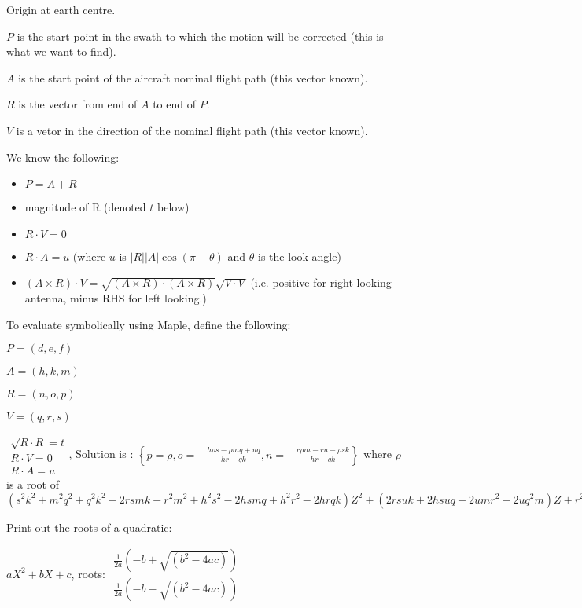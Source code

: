 \documentclass[12pt]{article}
\begin{document}
Origin at earth centre.

$P$ is the start point in the swath to which the motion will be corrected
(this is what we want to find).

$A$ is the start point of the aircraft nominal flight path (this vector
known).

$R$ is the vector from end of $A$ to end of $P$.

$V$ is a vetor in the direction of the nominal flight path (this vector
known).

We know the following:

\begin{itemize}
\item  $P=A+R$

\item  magnitude of R (denoted $t$ below)

\item  $R\cdot V=0$

\item  $R\cdot A=u$ (where $u$ is $\left| R\right| \left| A\right| \cos
\left( \pi -\theta \right) $ and $\theta $ is the look angle)

\item  $(A\times R)\cdot V=\sqrt{(A\times R)\cdot (A\times R)}\sqrt{V\cdot V}
$ (i.e. positive for right-looking antenna, minus RHS for left looking.)
\end{itemize}

To evaluate symbolically using Maple, define the following:

$P=(d,e,f)$

$A=(h,k,m)$

$R=(n,o,p)$

$V=(q,r,s)$

$
\begin{array}{l}
\sqrt{R\cdot R}=t \\ 
R\cdot V=0 \\ 
R\cdot A=u
\end{array}
$, Solution is : $\left\{ p=\rho ,o=-\frac{h\rho s-\rho mq+uq}{hr-qk},n=-%
\frac{r\rho m-ru-\rho sk}{hr-qk}\right\} $ where $\rho $ is a root of $%
\left(
s^{2}k^{2}+m^{2}q^{2}+q^{2}k^{2}-2rsmk+r^{2}m^{2}+h^{2}s^{2}-2hsmq+h^{2}r^{2}-2hrqk\right) Z^{2}+\left( 2rsuk+2hsuq-2umr^{2}-2uq^{2}m\right) Z+r^{2}u^{2}+u^{2}q^{2}-t^{2}h^{2}r^{2}+2t^{2}qhrk-t^{2}q^{2}k^{2} 
$

Print out the roots of a quadratic:

$aX^{2}+bX+c$, roots: $
\begin{array}{c}
\frac{1}{2a}\left( -b+\sqrt{\left( b^{2}-4ac\right) }\right) \\ 
\frac{1}{2a}\left( -b-\sqrt{\left( b^{2}-4ac\right) }\right)
\end{array}
$
\end{document}
